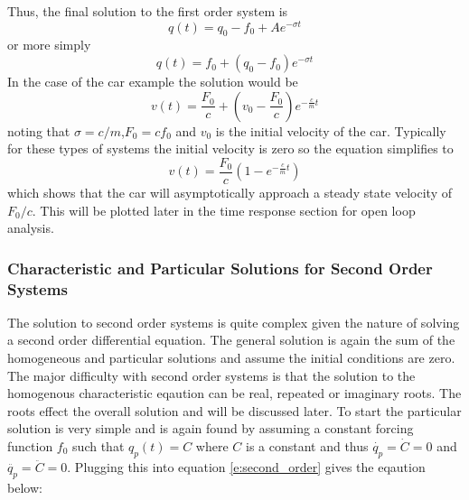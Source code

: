 Thus, the final solution to the first order system is 
\begin{equation}
    q(t) = q_0 - f_0 + Ae^{-\sigma t}
\end{equation}
or more simply
\begin{equation}
    q(t) = f_0 + (q_0 - f_0)e^{-\sigma t}
\end{equation}
In the case of the car example the solution would be
\begin{equation}
    v(t) = \frac{F_0}{c} + \left(v_0 - \frac{F_0}{c}\right)e^{-\frac{c}{m}t}
\end{equation}
noting that $\sigma = c/m$,$F_0 = cf_0$ and $v_0$ is the initial velocity of the car. Typically for these types of systems the initial velocity is zero so the equation simplifies to
\begin{equation}
    v(t) = \frac{F_0}{c}\left(1 - e^{-\frac{c}{m}t}\right)
\end{equation}
which shows that the car will asymptotically approach a steady state velocity of $F_0/c$. This will be plotted later in the time response section for open loop analysis.

\subsubsection{Characteristic and Particular Solutions for Second Order Systems}

The solution to second order systems is quite complex given the nature of solving a second order differential equation. The general solution is again the sum of the homogeneous and particular solutions and assume the initial conditions are zero. The major difficulty with second order systems is that the solution to the homogenous characteristic eqaution can be real, repeated or imaginary roots. The roots effect the overall solution and will be discussed later. To start the particular solution is very simple and is again found by assuming a constant forcing function $f_0$ such that $q_p(t)=C$ where $C$ is a constant and thus $\dot{q_p}=\dot{C}=0$ and $\ddot{q_p}=\ddot{C}=0$. Plugging this into equation \ref{e:second_order} gives the eqaution below:

